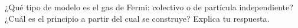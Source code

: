 \documentclass[./../main.tex]{subfiles}
\begin{document}
    \begin{exercise}
        ¿Qué tipo de modelo es el gas de Fermi: colectivo o de partícula independiente? ¿Cuál es el principio a partir del cual se construye? Explica tu respuesta.
    \end{exercise}
\end{document}
